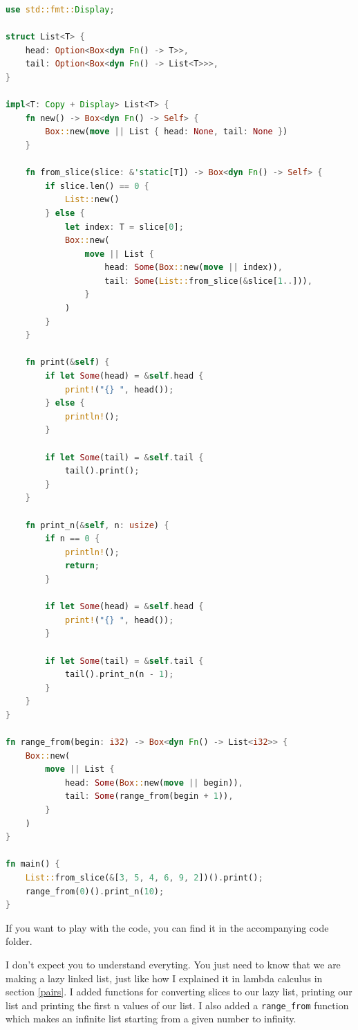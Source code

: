 \documentclass[11pt]{article}
\begin{document}
\begin{lstlisting}[language=Rust]
use std::fmt::Display;

struct List<T> {
    head: Option<Box<dyn Fn() -> T>>,
    tail: Option<Box<dyn Fn() -> List<T>>>,
}

impl<T: Copy + Display> List<T> {
    fn new() -> Box<dyn Fn() -> Self> {
        Box::new(move || List { head: None, tail: None })
    }

    fn from_slice(slice: &'static[T]) -> Box<dyn Fn() -> Self> {
        if slice.len() == 0 {
            List::new()
        } else {
            let index: T = slice[0];
            Box::new(
                move || List {
                    head: Some(Box::new(move || index)),
                    tail: Some(List::from_slice(&slice[1..])),
                }
            )
        }
    }

    fn print(&self) {
        if let Some(head) = &self.head {
            print!("{} ", head());
        } else {
            println!();
        }

        if let Some(tail) = &self.tail {
            tail().print();
        }
    }

    fn print_n(&self, n: usize) {
        if n == 0 {
            println!();
            return;
        }

        if let Some(head) = &self.head {
            print!("{} ", head());
        }

        if let Some(tail) = &self.tail {
            tail().print_n(n - 1);
        }
    }
}

fn range_from(begin: i32) -> Box<dyn Fn() -> List<i32>> {
    Box::new(
        move || List {
            head: Some(Box::new(move || begin)),
            tail: Some(range_from(begin + 1)),
        }
    )
}

fn main() {
    List::from_slice(&[3, 5, 4, 6, 9, 2])().print();
    range_from(0)().print_n(10);
}
\end{lstlisting}

If you want to play with the code, you can find it in the accompanying code
folder.

I don't expect you to understand everyting. You just need to know that we are
making a lazy linked list, just like how I explained it in lambda calculus in
section \ref{pairs}. I added functions for converting slices to our lazy list,
printing our list and printing the first n values of our list. I also added a
\texttt{range\_from} function which makes an infinite list starting from a
given number to infinity.
\end{document}
